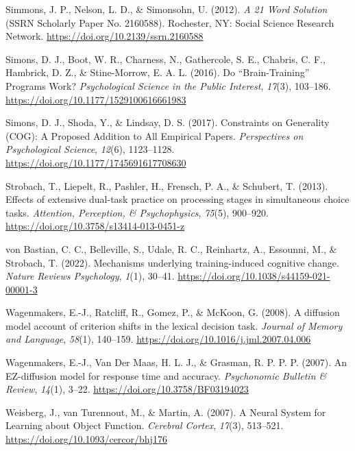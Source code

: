 \documentclass[
  man, donotrepeattitle,floatsintext]{apa6}
\newlength{\cslhangindent}
\newenvironment{CSLReferences}[2] %
 {\begin{list}{}{%
  \setlength{\itemindent}{0pt}
  \setlength{\leftmargin}{0pt}
  \setlength{\parsep}{0pt}
  \ifodd #1
   \setlength{\leftmargin}{\cslhangindent}
   \setlength{\itemindent}{-1\cslhangindent}
  \fi
  \setlength{\itemsep}{#2\baselineskip}}}
 {\end{list}}
\begin{document}
\begin{CSLReferences}{1}{0}
Simmons, J. P., Nelson, L. D., \& Simonsohn, U. (2012). \emph{A 21 {Word Solution}} (SSRN Scholarly Paper No. 2160588). Rochester, NY: Social Science Research Network. \url{https://doi.org/10.2139/ssrn.2160588}

Simons, D. J., Boot, W. R., Charness, N., Gathercole, S. E., Chabris, C. F., Hambrick, D. Z., \& Stine-Morrow, E. A. L. (2016). Do {``{Brain-Training}''} {Programs Work}? \emph{Psychological Science in the Public Interest}, \emph{17}(3), 103--186. \url{https://doi.org/10.1177/1529100616661983}

Simons, D. J., Shoda, Y., \& Lindsay, D. S. (2017). Constraints on {Generality} ({COG}): {A Proposed Addition} to {All Empirical Papers}. \emph{Perspectives on Psychological Science}, \emph{12}(6), 1123--1128. \url{https://doi.org/10.1177/1745691617708630}

Strobach, T., Liepelt, R., Pashler, H., Frensch, P. A., \& Schubert, T. (2013). Effects of extensive dual-task practice on processing stages in simultaneous choice tasks. \emph{Attention, Perception, \& Psychophysics}, \emph{75}(5), 900--920. \url{https://doi.org/10.3758/s13414-013-0451-z}

von Bastian, C. C., Belleville, S., Udale, R. C., Reinhartz, A., Essounni, M., \& Strobach, T. (2022). Mechanisms underlying training-induced cognitive change. \emph{Nature Reviews Psychology}, \emph{1}(1), 30--41. \url{https://doi.org/10.1038/s44159-021-00001-3}

Wagenmakers, E.-J., Ratcliff, R., Gomez, P., \& McKoon, G. (2008). A diffusion model account of criterion shifts in the lexical decision task. \emph{Journal of Memory and Language}, \emph{58}(1), 140--159. \url{https://doi.org/10.1016/j.jml.2007.04.006}

Wagenmakers, E.-J., Van Der Maas, H. L. J., \& Grasman, R. P. P. P. (2007). An {EZ-diffusion} model for response time and accuracy. \emph{Psychonomic Bulletin \& Review}, \emph{14}(1), 3--22. \url{https://doi.org/10.3758/BF03194023}

Weisberg, J., van Turennout, M., \& Martin, A. (2007). A {Neural System} for {Learning} about {Object Function}. \emph{Cerebral Cortex}, \emph{17}(3), 513--521. \url{https://doi.org/10.1093/cercor/bhj176}


\end{CSLReferences}
\end{document}
